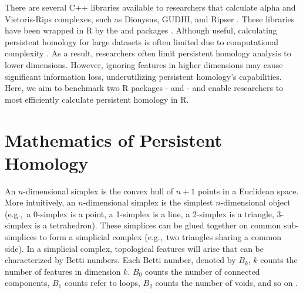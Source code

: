 There are several C++ libraries available to researchers that calculate
alpha and Vietoris-Rips complexes, such as Dionysus, GUDHI, and Ripser
\citep{Dionysus,gudhi,Ripser}. These libraries have been wrapped in R by
the  and  packages \citep{TDA,TDAstats}.
Although useful, calculating persistent homology for large datasets is
often limited due to computational complexity \citep{roadmap}. As a
result, researchers often limit persistent homology analysis to lower
dimensions. However, ignoring features in higher dimensions may cause
significant information loss, underutilizing persistent homology's
capabilities. Here, we aim to benchmark two R packages - 
and  - and enable researchers to most efficiently
calculate persistent homology in R.

\hypertarget{mathematics-of-persistent-homology}{%
\section{Mathematics of Persistent
Homology}\label{mathematics-of-persistent-homology}}

An \(n\)-dimensional simplex is the convex hull of \(n+1\) points in a
Euclidean space. More intuitively, an \(n\)-dimensional simplex is the
simplest \(n\)-dimensional object (e.g.,~a 0-simplex is a point, a
1-simplex is a line, a 2-simplex is a triangle, 3-simplex is a
tetrahedron). These simplices can be glued together on common
sub-simplices to form a simplicial complex (e.g.,~two triangles sharing a
common side). In a simplicial complex, topological features will arise
that can be characterized by Betti numbers. Each Betti number, denoted
by \(B_k\), \(k\) counts the number of features in dimension \(k\).
\(B_0\) counts the number of connected components, \(B_1\) counts refer
to loops, \(B_2\) counts the number of voids, and so on
\citep{phom-survey}.

